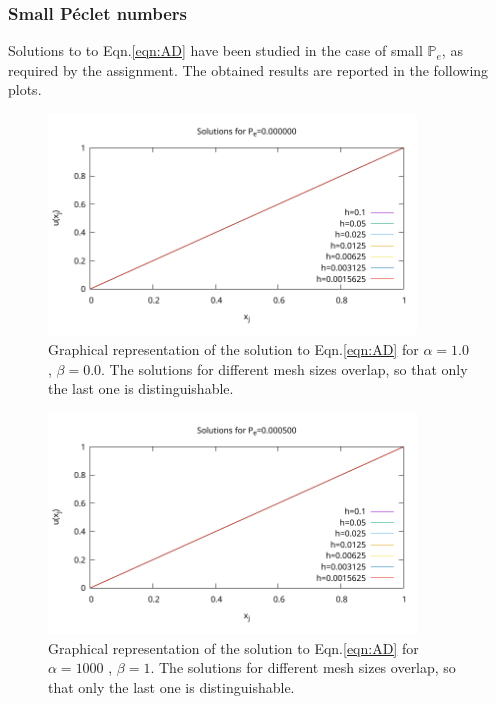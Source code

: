 \documentclass[11pt]{article}
\theoremstyle{theorem}
\theoremstyle{definition}
\begin{document}
\subsubsection{Small P\'{e}clet numbers}
Solutions to to Eqn.\eqref{eqn:AD} have been studied in the case of small $\mathbb{P}_e$, as required by the assignment. The obtained results are reported in the following plots.
\begin{figure}[H]
	\begin{center}
		\includegraphics[width=0.87\textwidth]{ADRsol5.pdf}
	\end{center}
	\caption{Graphical representation of the solution to Eqn.\eqref{eqn:AD} for $\alpha=1.0$ , $\beta=0.0$. The solutions for different mesh sizes overlap, so that only the last one is distinguishable.
		\label{fig:P_0}}
\end{figure}

\begin{figure}[H]
	\begin{center}
		\includegraphics[width=0.87\textwidth]{ADRsol1.pdf}
	\end{center}
	\caption{Graphical representation of the solution to Eqn.\eqref{eqn:AD} for $\alpha=1000$ , $\beta=1$. The solutions for different mesh sizes overlap, so that only the last one is distinguishable.
		\label{fig:P_0.0005}}
\end{figure} 
\end{document}
